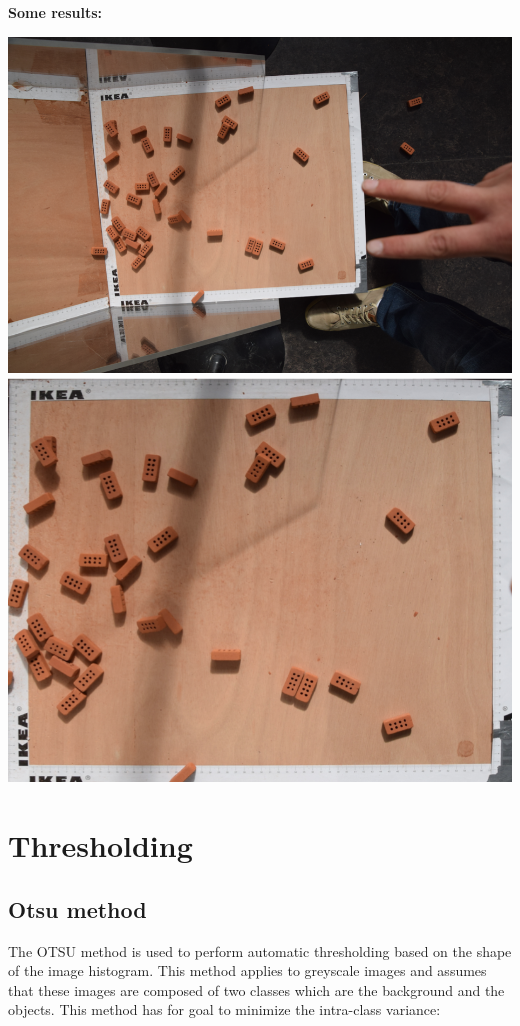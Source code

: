 \documentclass{article}
\begin{document}
\textbf{Some results:}
\begin{center}
    \includegraphics[scale=0.4]{images/result_1.png}  
    \includegraphics[scale=0.4]{images/resul_1.png}      
\end{center}


\section{Thresholding}

\subsection{Otsu method}
The OTSU method is used to perform automatic thresholding based on the shape of the image histogram.
This method applies to greyscale images and assumes that these images are composed of two classes which are the background and the objects.
This method has for goal to minimize the intra-class variance:\\
\\
\end{document}
